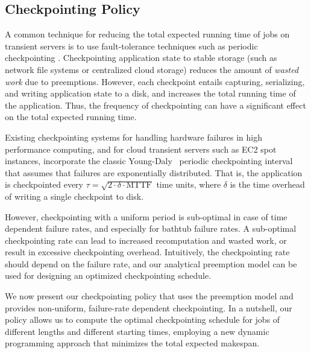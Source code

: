 

\subsection{Checkpointing Policy}

A common technique for reducing the total expected running time of jobs on transient servers is to use fault-tolerance techniques such as periodic checkpointing \cite{flint}.
Checkpointing application state to stable storage (such as network file systems or centralized cloud storage) reduces the amount of \emph{wasted work} due to preemptions.
However, each checkpoint entails capturing, serializing, and writing application state to a disk, and increases the total running time of the application.
Thus, the frequency of checkpointing can have a significant effect on the total expected running time.

Existing checkpointing systems for handling hardware failures in high performance computing, and for cloud transient servers such as EC2 spot instances, incorporate the classic Young-Daly~\cite{dongarra_fault_nodate, daly2006higher, flint, marathe2014exploiting} periodic checkpointing interval that assumes that failures are exponentially distributed. 
That is, the application is checkpointed every $\tau = \sqrt{2 \cdot \delta \cdot \text{MTTF}}$ time units, where $\delta$ is the time overhead of writing a single checkpoint to disk. 


However, checkpointing with a uniform period is sub-optimal in case of time dependent failure rates, and especially for bathtub failure rates.
A sub-optimal checkpointing rate can lead to increased recomputation and wasted work, or result in excessive checkpointing overhead. 
Intuitively, the checkpointing rate should depend on the failure rate, and our analytical preemption model can be used for designing an optimized checkpointing schedule.

We now present our checkpointing policy that uses the preemption model and provides non-uniform, failure-rate dependent checkpointing.
In a nutshell, our policy allows us to compute the optimal checkpointing schedule for jobs of different lengths and different starting times, employing a new dynamic programming approach that minimizes the total expected makespan. 

